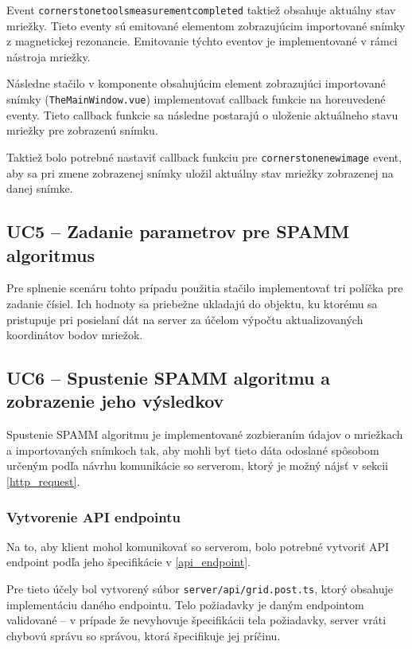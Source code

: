 Event \texttt{cornerstonetoolsmeasurementcompleted} taktiež obsahuje aktuálny stav mriežky.
Tieto eventy sú emitované elementom zobrazujúcim importované snímky z magnetickej rezonancie. Emitovanie týchto eventov je implementované v rámci nástroja mriežky.

Následne stačilo v komponente obsahujúcim element zobrazujúci importované snímky (\texttt{TheMainWindow.vue}) implementovať callback funkcie na horeuvedené eventy. Tieto callback funkcie sa následne postarajú o uloženie aktuálneho stavu mriežky pre zobrazenú snímku. 

Taktiež bolo potrebné nastaviť callback funkciu pre \texttt{cornerstonenewimage} event, aby sa pri zmene zobrazenej snímky uložil aktuálny stav mriežky zobrazenej na danej snímke.

\clearpage

\subsection {UC5 -- Zadanie parametrov pre SPAMM algoritmus}
Pre splnenie scenáru tohto prípadu použitia stačilo implementovať tri políčka pre zadanie čísiel. Ich hodnoty sa priebežne ukladajú do objektu, ku ktorému sa pristupuje pri posielaní dát na server za účelom výpočtu aktualizovaných koordinátov bodov mriežok.

\subsection {UC6 -- Spustenie SPAMM algoritmu a zobrazenie jeho výsledkov}
Spustenie SPAMM algoritmu je implementované zozbieraním údajov o mriežkach a importovaných snímkoch tak, aby mohli byť tieto dáta odoslané spôsobom určeným podľa návrhu komunikácie so serverom, ktorý je možný nájsť v sekcii \ref{http_request}.

\subsubsection {Vytvorenie API endpointu}
Na to, aby klient mohol komunikovať so serverom, bolo potrebné vytvoriť API endpoint podľa jeho špecifikácie v \ref{api_endpoint}.

Pre tieto účely bol vytvorený súbor \texttt{server/api/grid.post.ts}, ktorý obsahuje implementáciu daného endpointu. Telo požiadavky je daným endpointom validované --  v prípade že nevyhovuje špecifikácii tela požiadavky, server vráti chybovú správu so správou, ktorá špecifikuje jej príčinu.

